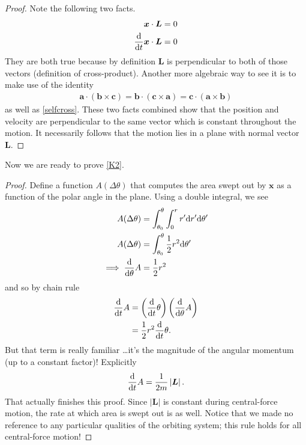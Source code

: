 \begin{proof}
Note the following two facts. 
\begin{align}
    \bm{x} \cdot \bm{L} &= 0\\
    \frac{\mathrm{d}}{\mathrm{d}t}{\bm x} \cdot \bm{L} &= 0
\end{align}
They are both true because by definition $\bm{L}$ is perpendicular to both of those vectors (definition of cross-product). Another more algebraic way to see it is to make use of the identity 
\begin{align}\label{cycliccross}
    \bm a \cdot \left(\bm b \times \bm c\right) = \bm b \cdot \left(\bm c \times \bm a\right) = \bm c \cdot \left(\bm a \times \bm b\right)
\end{align}
as well as \ref{selfcross}. These two facts combined show that the position and velocity are perpendicular to the same vector which is constant throughout the motion. It necessarily follows that the motion lies in a plane with normal vector $\bm L$.
\end{proof}
Now we are ready to prove \ref{K2}. 
\begin{proof}
Define a function $A(\Delta \theta)$ that computes the area swept out by $\bm x$ as a function of the polar angle in the plane. Using a double integral, we see 
\begin{align}
    A(\Delta \theta) &= \int_{\theta_0}^{\theta}\int_{0}^{r} r'\mathrm{d}r'\mathrm{d}\theta' \\
    A(\Delta \theta) &= \int_{\theta_0}^{\theta} \frac{1}{2}r^2 \mathrm{d}\theta' \\
    \implies \frac{\mathrm{d}}{\mathrm{d}\theta}{A} &= \frac{1}{2}r^2 \\
\end{align}
and so by chain rule
\begin{align}
    \frac{\mathrm{d}}{\mathrm{d}t}{A} &= \left(\frac{\mathrm{d}}{\mathrm{d}t}{\theta}\right)\left(\frac{\mathrm{d}}{\mathrm{d}\theta}{A}\right) \\
    &= \frac{1}{2}r^2\frac{\mathrm{d}}{\mathrm{d}t}{\theta}. \\
\end{align}
But that term is really familiar \dots it's the magnitude of the angular momentum (up to a constant factor)! Explicitly 
\begin{equation}\label{rateofarea}
    \frac{\mathrm{d}}{\mathrm{d}t}{A} = \frac{1}{2m}\left|\bm{L}\right|.
\end{equation}
That actually finishes this proof. Since $\left|\bm L\right|$ is constant during central-force motion, the rate at which area is swept out is as well. Notice that we made no reference to any particular qualities of the orbiting system; this rule holds for all central-force motion!
\end{proof}


